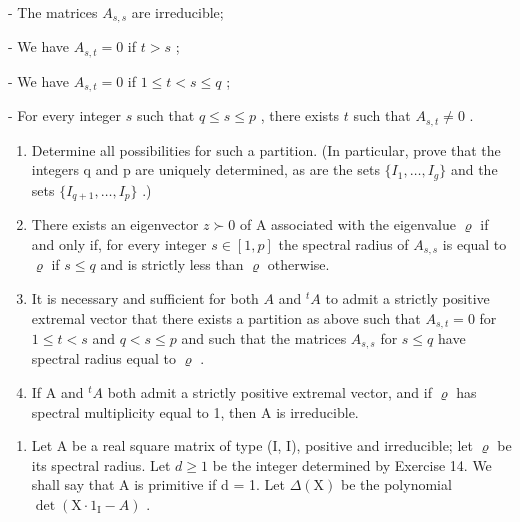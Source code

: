 - The matrices \(A_{s,s}\) are irreducible;

- We have \(A_{s,t} = 0\) if \(t > s\) ;

- We have \(A_{s,t} = 0\) if \(1 \leqslant t < s \leqslant q\) ;

- For every integer \(s\) such that \(q \leqslant s \leqslant p\) , there exists \(t\) such that \(A_{s,t} \neq 0\) .

\begin{enumerate}
\def\labelenumi{\alph{enumi})}
\setcounter{enumi}{1}
\item
  Determine all possibilities for such a partition. (In particular, prove that the integers q and p are uniquely determined, as are the sets \(\{I_{1},\ldots,I_{g}\}\) and the sets \(\{I_{q+1},\ldots,I_{p}\}\) .)
\item
  There exists an eigenvector \(z \succ 0\) of A associated with the eigenvalue \(\varrho\) if and only if, for every integer \(s \in [1, p]\) the spectral radius of \(A_{s,s}\) is equal to \(\varrho\) if \(s \leqslant q\) and is strictly less than \(\varrho\) otherwise.
\item
  It is necessary and sufficient for both \(A\) and \({}^t A\) to admit a strictly positive extremal vector that there exists a partition as above such that \(A_{s,t} = 0\) for \(1 \leqslant t < s\) and \(q < s \leqslant p\) and such that the matrices \(A_{s,s}\) for \(s \leqslant q\) have spectral radius equal to \(\varrho\) .
\item
  If A and \(^{t}A\) both admit a strictly positive extremal vector, and if \(\varrho\) has spectral multiplicity equal to 1, then A is irreducible.
\end{enumerate}

\begin{enumerate}
\def\labelenumi{\arabic{enumi})}
\setcounter{enumi}{21}
\tightlist
\item
  Let A be a real square matrix of type (I, I), positive and irreducible; let \(\varrho\) be its spectral radius. Let \(d \geqslant 1\) be the integer determined by Exercise 14. We shall say that A is primitive if d = 1. Let \(\Delta(\mathrm{X})\) be the polynomial \(\det(\mathrm{X} \cdot 1_{\mathrm{I}} - A)\) .
\end{enumerate}

